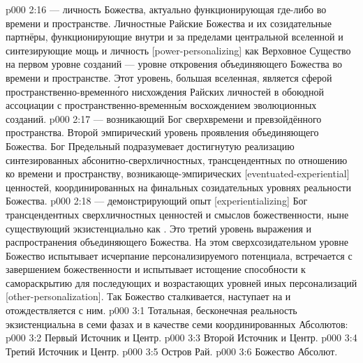 \vs p000 2:16 \bibnobreakspace {} --- личность Божества, актуально функционирующая где\hyp{}либо во времени и пространстве. Личностные Райские Божества и их созидательные партнёры, функционирующие внутри и за пределами центральной вселенной и синтезирующие мощь и личность [power\hyp{}personalizing] как Верховное Существо на первом уровне созданий --- уровне откровения объединяющего Божества во времени и пространстве. Этот уровень, большая вселенная, является сферой пространственно\hyp{}временн\'ого нисхождения Райских личностей в обоюдной ассоциации с пространственно\hyp{}временн\'ым восхождением эволюционных созданий.
\vs p000 2:17 \bibnobreakspace {} --- возникающий Бог сверхвремени и превзойдённого пространства. Второй эмпирический уровень проявления объединяющего Божества. Бог Предельный подразумевает достигнутую реализацию синтезированных абсонитно\hyp{}сверхличностных, трансцендентных по отношению ко времени и пространству, возникающе\hyp{}эмпирических [eventuated\hyp{}experiential] ценностей, координированных на финальных созидательных уровнях реальности Божества.
\vs p000 2:18 \bibnobreakspace {} --- демонстрирующий опыт [experientializing] Бог трансцендентных сверхличностных ценностей и смыслов божественности, ныне существующий экзистенциально как . Это третий уровень выражения и распространения объединяющего Божества. На этом сверхсозидательном уровне Божество испытывает исчерпание персонализируемого потенциала, встречается с завершением божественности и испытывает истощение способности к самораскрытию для последующих и возрастающих уровней иных персонализаций [other\hyp{}personalization]. Так Божество сталкивается, наступает на  и отождествляется с ним.
\vs p000 3:1 Тотальная, бесконечная реальность экзистенциальна в семи фазах и в качестве семи координированных Абсолютов:
\vs p000 3:2 \bibnobreakspace Первый Источник и Центр.
\vs p000 3:3 \bibnobreakspace Второй Источник и Центр.
\vs p000 3:4 \bibnobreakspace Третий Источник и Центр.
\vs p000 3:5 \bibnobreakspace Остров Рай.
\vs p000 3:6 \bibnobreakspace Божество Абсолют.
